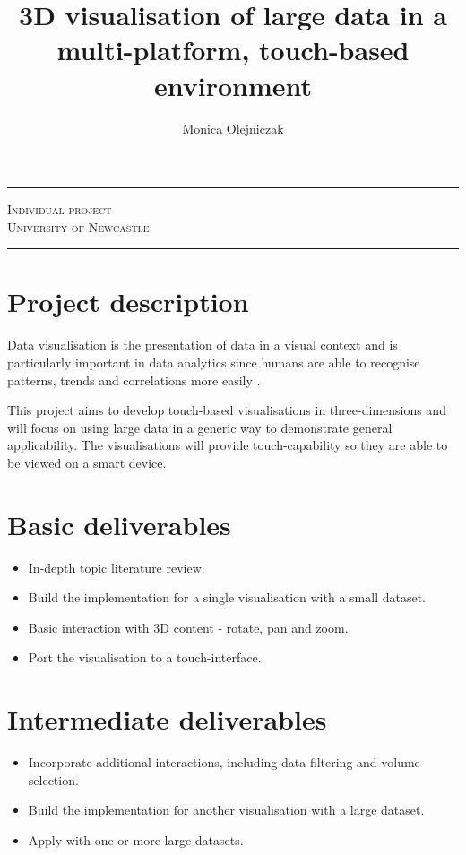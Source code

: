 \documentclass[a4paper]{article}
\title{3D visualisation of large data in a multi-platform, touch-based environment}
\author{Monica Olejniczak}
\begin{document}
	\makeatletter
	\vspace*{\fill}
	\begin{center}
		\Huge\textbf{\textsf{\@title}}
		\rule{\textwidth}{1pt}
		\LARGE\textsc{Individual project} \\
		\Large\textsc{University of Newcastle}
		\rule{\textwidth}{1pt}
		\Large\textbf{\textsf{\@author}}
	\end{center}
	\vspace*{\fill}
	\makeatother
	\newpage
	
	\section{Project description} {
	
		Data visualisation is the presentation of data in a visual context and is particularly important in data analytics since humans are able to recognise patterns, trends and correlations more easily \citep{grinstein2002introduction}.
		
		This project aims to develop touch-based visualisations in three-dimensions and will focus on using large data in a generic way to demonstrate general applicability. The visualisations will provide touch-capability so they are able to be viewed on a smart device.
	
	}
	
	\section{Basic deliverables} {

		\begin{itemize}
			\item In-depth topic literature review.
			\item Build the implementation for a single visualisation with a small dataset.
			\item Basic interaction with 3D content - rotate, pan and zoom.
			\item Port the visualisation to a touch-interface.
		\end{itemize}
	
	}
	
	\section{Intermediate deliverables} {
	
		\begin{itemize}
			\item Incorporate additional interactions, including data filtering and volume selection.
			\item Build the implementation for another visualisation with a large dataset.
			\item Apply with one or more large datasets.
		\end{itemize}	
	
	}
	
\end{document}

